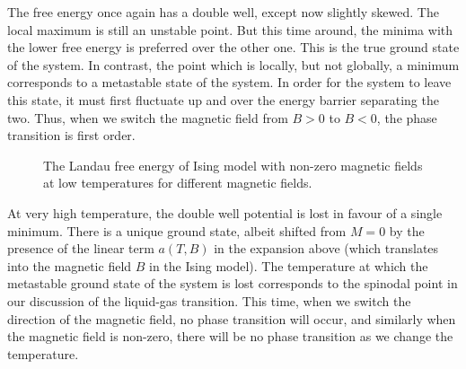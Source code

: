 \documentclass{article}
\theoremstyle{plain}\theoremheaderfont{\normalfont\bfseries}\theorembodyfont{\rmfamily}\theoremseparator{.}\newtheorem*{thm}{Theorem}\newtheorem*{law}{Law}\newtheorem*{pos}{Postulate}
\numberwithin{equation}{section}
\begin{document}
    The free energy once again has a double well, except now slightly skewed. The local maximum is still an unstable point. But this time around, the minima with the lower free energy is preferred over the other one. This is the true ground state of the system. In contrast, the point which is locally, but not globally, a minimum corresponds to a metastable state of the system. In order for the system to leave this state, it must first fluctuate up and over the energy barrier separating the two. Thus, when we switch the magnetic field from \(B>0\) to \(B<0\), the phase transition is first order.

    \begin{figure}
        \centering
        \caption{The Landau free energy of Ising model with non-zero magnetic fields at low temperatures for different magnetic fields.}
    \end{figure}

    At very high temperature, the double well potential is lost in favour of a single minimum. There is a unique ground state, albeit shifted from \(M=0\) by the presence of the linear term \(a(T,B)\) in the expansion above (which translates into the magnetic field \(B\) in the Ising model). The temperature at which the metastable ground state of the system is lost corresponds to the spinodal point in our discussion of the liquid-gas transition. This time, when we switch the direction of the magnetic field, no phase transition will occur, and similarly when the magnetic field is non-zero, there will be no phase transition as we change the temperature.
\end{document}
